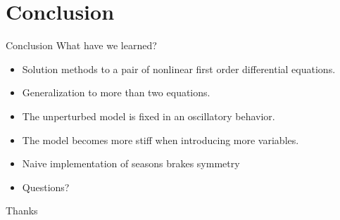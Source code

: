 \documentclass{beamer}
\begin{document}
\section{Conclusion}
\begin{frame}{Conclusion}
	What have we learned?
	\begin{itemize}
		\item<2-> Solution methods to a pair of nonlinear first order differential equations.
		\item<3-> Generalization to more than two equations.
		\item<4-> The unperturbed model is fixed in an oscillatory behavior.
		\item<5-> The model becomes more stiff when introducing more variables.
		\item<6-> Naive implementation of seasons brakes symmetry
		\item<7-> Questions?
	\end{itemize}
\end{frame}
\begin{frame}{Thanks}
\end{frame}
\end{document}
